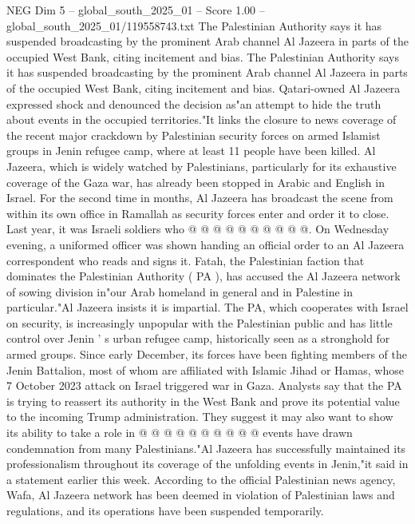 \begin{textsample}{NEG Dim 5 – global\_south\_2025\_01 – Score 1.00 – global\_south\_2025\_01/119558743.txt}  \label{ex:f5_neg_156}
The Palestinian Authority says it has suspended broadcasting by the prominent Arab channel Al Jazeera in parts of the occupied West Bank, citing incitement and bias.
The Palestinian Authority says it has suspended broadcasting by the prominent Arab channel Al Jazeera in parts of the occupied West Bank, citing incitement and bias.
Qatari-owned Al Jazeera expressed shock and denounced the decision as"an attempt to hide the truth about events in the occupied territories."It links the closure to news coverage of the recent major crackdown by Palestinian security forces on armed Islamist groups in Jenin refugee camp, where at least 11 people have been killed.
Al Jazeera, which is widely watched by Palestinians, particularly for its exhaustive coverage of the Gaza war, has already been stopped in Arabic and English in Israel.
For the second time in months, Al Jazeera has broadcast the scene from within its own office in Ramallah as security forces enter and order it to close.
Last year, it was Israeli soldiers who @ @ @ @ @ @ @ @ @ @.
On Wednesday evening, a uniformed officer was shown handing an official order to an Al Jazeera correspondent who reads and signs it.
Fatah, the Palestinian faction that dominates the Palestinian Authority ( PA ), has accused the Al Jazeera network of sowing division in"our Arab homeland in general and in Palestine in particular."Al Jazeera insists it is impartial.
The PA, which cooperates with Israel on security, is increasingly unpopular with the Palestinian public and has little control over Jenin ' s urban refugee camp, historically seen as a stronghold for armed groups.
Since early December, its forces have been fighting members of the Jenin Battalion, most of whom are affiliated with Islamic Jihad or Hamas, whose 7 October 2023 attack on Israel triggered war in Gaza.
Analysts say that the PA is trying to reassert its authority in the West Bank and prove its potential value to the incoming Trump administration.
They suggest it may also want to show its ability to take a role in @ @ @ @ @ @ @ @ @ @ events have drawn condemnation from many Palestinians."Al Jazeera has successfully maintained its professionalism throughout its coverage of the unfolding events in Jenin,"it said in a statement earlier this week.
According to the official Palestinian news agency, Wafa, Al Jazeera network has been deemed in violation of Palestinian laws and regulations, and its operations have been suspended temporarily.

\end{textsample}
